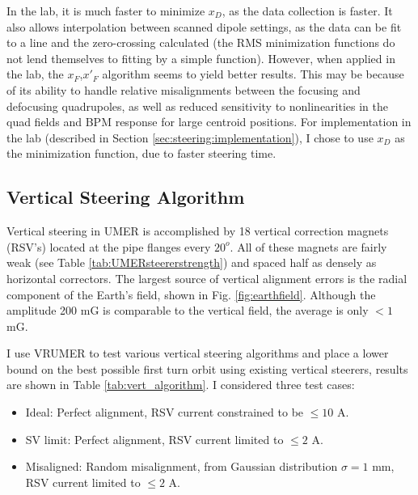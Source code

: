 In the lab, it is much faster to minimize $x_D$, as the data collection is faster. It also allows interpolation between scanned dipole settings, as the data can be fit to a line and the zero-crossing calculated (the RMS minimization functions do not lend themselves to fitting by a simple function). 
However, when applied in the lab, the $x_F$,$x'_F$ algorithm seems to yield better results. 
This may be because of its ability to handle relative misalignments between the focusing and defocusing quadrupoles, as well as reduced sensitivity to nonlinearities in the quad fields and BPM response for large centroid positions. 
For implementation in the lab (described in Section \ref{sec:steering:implementation}), I chose to use $x_D$ as the minimization function, due to faster steering time.





\subsection{Vertical Steering Algorithm}

Vertical steering in UMER is accomplished by 18 vertical correction magnets (RSV's) located at the pipe flanges every $20^o$. All of these magnets are fairly weak (see Table \ref{tab:UMERsteererstrength}) and spaced half as densely as horizontal correctors.  The largest source of vertical alignment errors is the radial component of the Earth's field, shown in Fig. \ref{fig:earthfield}. Although the amplitude 200 mG is comparable to the vertical field, the average is only $<1$ mG.

I use VRUMER to test various vertical steering algorithms and place a lower bound on the best possible first turn orbit using existing vertical steerers, results are shown in Table \ref{tab:vert_algorithm}. I considered three test cases:

\begin{itemize} 
\item Ideal: Perfect alignment, RSV current constrained to be $\le10$ A. 
\item SV limit: Perfect alignment, RSV current limited to $\le2$ A.
\item Misaligned: Random misalignment, from Gaussian distribution $\sigma=1$ mm, RSV current limited to $\le2$ A.
\end{itemize}


